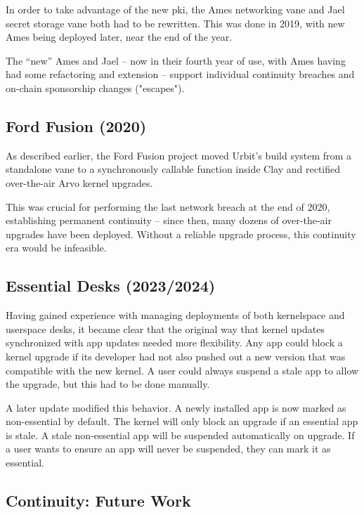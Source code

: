 \documentclass[twoside]{article}
\begin{document}
In order to take advantage of the new {\sc pki}, the Ames networking vane and Jael secret storage vane both had to be rewritten.  This was done in 2019, with new Ames being deployed later, near the end of the year.  

The ``new'' Ames and Jael – now in their fourth year of use, with Ames having had some refactoring and extension – support individual continuity breaches and on-chain sponsorship changes ("escapes").  

\subsection{Ford Fusion (2020)}

As described earlier, the Ford Fusion project moved Urbit's build system from a standalone vane to a synchronously callable function inside Clay and rectified over-the-air Arvo kernel upgrades.

This was crucial for performing the last network breach at the end of 2020, establishing permanent continuity – since then, many dozens of over-the-air upgrades have been deployed.  Without a reliable upgrade process, this continuity era would be infeasible.

\subsection{Essential Desks (2023/2024)}

Having gained experience with managing deployments of both kernelspace and userspace desks, it became clear that the original way that kernel updates synchronized with app updates needed more flexibility.  Any app could block a kernel upgrade if its developer had not also pushed out a new version that was compatible with the new kernel.  A user could always suspend a stale app to allow the upgrade, but this had to be done manually.

A later update modified this behavior.  A newly installed app is now marked as non-essential by default.  The kernel will only block an upgrade if an essential app is stale. A stale non-essential app will be suspended automatically on upgrade.  If a user wants to ensure an app will never be suspended, they can mark it as essential.

\subsection{Continuity: Future Work}
\end{document}
